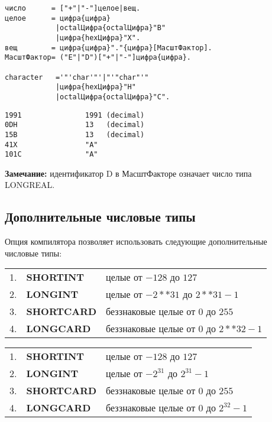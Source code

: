 \begin{verbatim}
число      = ["+"|"-"]целое|вещ.
целое      = цифра{цифра}
            |octalЦифра{octalЦифра}"B"
            |цифра{hexЦифра}"X".
вещ        = цифра{цифра}"."{цифра}[МасштФактор].
МасштФактор= ("E"|"D")["+"|"-"]цифра{цифра}.

character   ='"'char'"'|"'"char"'"
            |цифра{hexЦифра}"H"
            |octalЦифра{octalЦифра}"C".
\end{verbatim}

\Examples
\begin{verbatim}
1991               1991 (decimal)
0DH                13   (decimal)
15B                13   (decimal)
41X                "A"
101C               "A"
\end{verbatim}

{\bf Замечание:} идентификатор D в МасштФакторе означает
число типа LONGREAL.

\subsection{Дополнительные числовые типы}\label{m2:ext:numeric}

\maddonly

Опция компилятора  позволяет использовать 
следующие дополнительные числовые типы:

\ifonline
\begin{flushleft}
\begin{tabular}{lll}
1. &\bf SHORTINT  & целые от $-128$ до $127$          \\
2. &\bf LONGINT   & целые от $-2**31$ до $2**31-1$  \\
3. &\bf SHORTCARD & беззнаковые целые от $0$ до $255$        \\
4. &\bf LONGCARD  & беззнаковые целые от $0$ до $2**32-1$   \\
\end{tabular}
\end{flushleft}
\else
\begin{flushleft}
\begin{tabular}{lll}
1. &\bf SHORTINT  & целые от $-128$ до $127$          \\
2. &\bf LONGINT   & целые от $-2^{31}$ до $2^{31}-1$  \\
3. &\bf SHORTCARD & беззнаковые целые от $0$ до $255$        \\
4. &\bf LONGCARD  & беззнаковые целые от $0$ до $2^{32}-1$   \\
\end{tabular}
\end{flushleft}
\fi


